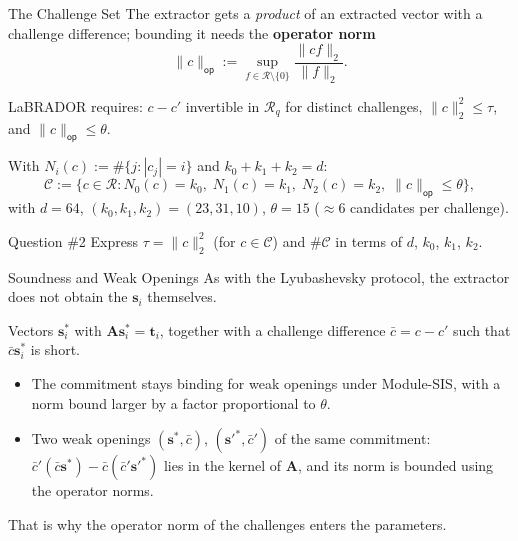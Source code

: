 \documentclass{zkdl-presentation-template}
\begin{document}
    \begin{frame}{The Challenge Set}
        The extractor gets a \emph{product} of an extracted vector with a challenge difference; bounding it needs the \textbf{operator norm}
        \begin{equation*}
            \|c\|_{\mathsf{op}} := \sup_{f \in \mathcal{R}\setminus\{0\}} \frac{\|cf\|_2}{\|f\|_2}.
        \end{equation*}
        \pause
        \vspace{-10pt}

        LaBRADOR requires: $c - c'$ invertible in $\mathcal{R}_q$ for distinct challenges, $\|c\|_2^2 \leq \tau$, and $\|c\|_{\mathsf{op}} \leq \theta$.
        \pause

        With $N_i(c) := \#\{j: |c_j| = i\}$ and $k_0 + k_1 + k_2 = d$:
        \begin{equation*}
            \mathcal{C} := \big\{ c \in \mathcal{R} : N_0(c) = k_0, \; N_1(c) = k_1, \; N_2(c) = k_2, \; \|c\|_{\mathsf{op}} \leq \theta \big\},
        \end{equation*}
        with $d = 64$, $(k_0, k_1, k_2) = (23, 31, 10)$, $\theta = 15$ ($\approx 6$ candidates per challenge).
        \pause

        \begin{questionblock}{Question \#2}
            Express $\tau = \|c\|_2^2$ (for $c \in \mathcal{C}$) and $\#\mathcal{C}$ in terms of $d$, $k_0$, $k_1$, $k_2$.
        \end{questionblock}
    \end{frame}

    \begin{frame}{Soundness and Weak Openings}
        As with the Lyubashevsky protocol, the extractor does not obtain the $\mathbf{s}_i$ themselves.
        \begin{definition}
            Vectors $\mathbf{s}_i^{\ast}$ with $\mathbf{A}\mathbf{s}_i^{\ast} = \mathbf{t}_i$, together with a challenge difference $\bar{c} = c - c'$ such that $\bar{c}\mathbf{s}_i^{\ast}$ is short.
        \end{definition}
        \pause

        \begin{itemize}
            \item The commitment stays binding for weak openings under Module-SIS, with a norm bound larger by a factor proportional to $\theta$.\pause
            \item Two weak openings $(\mathbf{s}^{\ast}, \bar{c})$, $(\mathbf{s}'^{\ast}, \bar{c}')$ of the same commitment: $\bar{c}'(\bar{c}\mathbf{s}^{\ast}) - \bar{c}(\bar{c}'\mathbf{s}'^{\ast})$ lies in the kernel of $\mathbf{A}$, and its norm is bounded using the operator norms.
        \end{itemize}
        \pause

        That is why the operator norm of the challenges enters the parameters.
    \end{frame}
\end{document}
